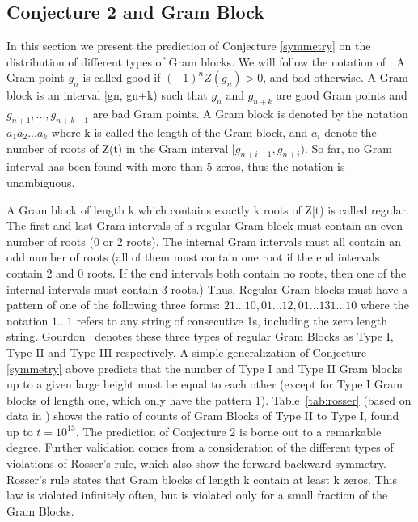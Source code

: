 \documentclass[twoside]{article}
\begin{document}
\subsection{\label{sec4c}Conjecture 2 and Gram Block}
In this section we present the prediction of  Conjecture \ref{symmetry} on the distribution of different types of Gram blocks. We will follow the notation of  \cite{gourdon}.
A Gram point $g_n$ is called good if $(-1)^nZ(g_n) > 0$, and bad otherwise. A Gram block is an interval [gn, gn+k) such that $g_n$  and $g_{n+k}$ are good Gram points 
and $g_{n+1}, . . ., g_{n+k-1}$ are bad Gram points. A Gram block is denoted by the notation $a_1a_2 . . . a_k$ where k is called the length of the Gram block, and $a_i$ denote the number of roots of Z(t) in the Gram interval $[g_{n+i-1}, g_{n+i})$. So far, no Gram interval has been found with more than 5 zeros, thus the notation is unambiguous.

A Gram block of length k which contains exactly k roots of Z[t) is called regular. The first and last Gram intervals of a regular Gram block must contain an even number of roots (0 or 2 roots). The internal Gram intervals must all contain an odd number of roots (all of them must contain one root if the end intervals contain 2 and 0 roots. If the end intervals both contain no roots, then one of the internal intervals must contain 3 roots.) 
Thus, Regular Gram blocks must have a pattern of one of the following three forms:
$21 . . . 10, 01 . . . 12, 01 . . . 131 . . . 10$
where the notation $1 . . . 1$ refers to any string of consecutive 1s, including the zero length string. Gourdon~\cite{gourdon} denotes these three types of regular Gram Blocks as Type I, Type II and Type III respectively. A simple generalization of Conjecture \ref{symmetry} above predicts that the number of Type I and Type II Gram blocks up to a given large height must be equal to each other (except for Type I Gram blocks of length one, which only have the pattern 1).  Table~\ref{tab:rosser}  (based on data in \cite{gourdon}) shows the ratio of counts of Gram Blocks of Type II to Type I, found up to $t = 10^{13}$. The prediction of Conjecture 2 is borne out to a remarkable degree. Further validation comes from a consideration of the different types of violations of Rosser's rule, which also show the forward-backward symmetry. Rosser's rule states that Gram blocks of length k contain at least k zeros. This law is violated infinitely often, but is violated only for a small fraction of the Gram Blocks.
\end{document}
